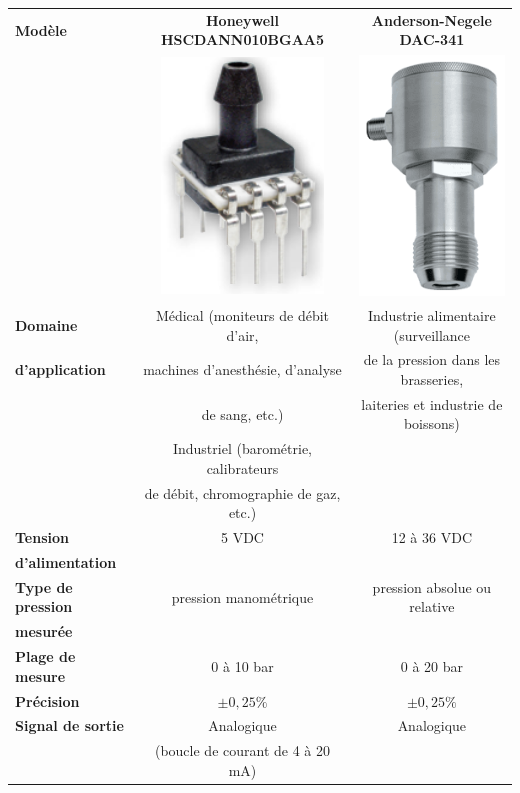 \documentclass{article}
\begin{document}
    \begin{table}[H]
        \centering
        \begin{tabular}{l|c|c}
            \textbf{Modèle} & \textbf{Honeywell HSCDANN010BGAA5} & \textbf{Anderson-Negele DAC-341}\\
                & \includegraphics[width=0.15\linewidth]{./images/piezo-honeywell.png} & \includegraphics[width=0.15\linewidth]{./images/piezo-anderson-negele.png}\\
                \hline
                \textbf{Domaine}            & Médical (moniteurs de débit d'air,    & Industrie alimentaire (surveillance \\
                \textbf{d'application}      & machines d'anesthésie, d'analyse      & de la pression dans les brasseries, \\
                                            & de sang, etc.)                        & laiteries et industrie de boissons) \\
                                            & Industriel (barométrie, calibrateurs  & \\
                                            & de débit, chromographie de gaz, etc.) & \\
                \hline
                \textbf{Tension}            & 5 VDC                                 & 12 à 36 VDC                           \\
                \textbf{d'alimentation}     & & \\
                \hline
                \textbf{Type de pression}   & pression manométrique                 & pression absolue ou relative          \\
                \textbf{mesurée}            & & \\
                \hline
                \textbf{Plage de mesure}    & 0 à 10 bar                            & 0 à 20 bar                            \\
                \hline
                \textbf{Précision}          & $\pm 0,25 \%$                         & $\pm 0,25 \%$                         \\
                \hline
                \textbf{Signal de sortie}   & Analogique                            & Analogique                            \\
                                            & (boucle de courant de 4 à 20 mA)      & \\
            \end{tabular}
            \end{table}
\end{document}
